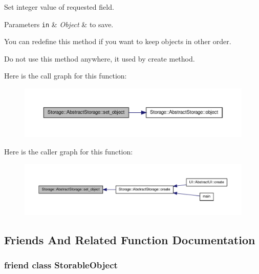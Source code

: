 Set integer value of requested field. 


\begin{DoxyParams}[1]{Parameters}
\mbox{\tt in}  & {\em Object} & to save.\\
\hline
\end{DoxyParams}
You can redefine this method if you want to keep objects in other order.

Do not use this method anywhere, it used by create method. 

Here is the call graph for this function:
\nopagebreak
\begin{figure}[H]
\begin{center}
\leavevmode
\includegraphics[width=400pt]{d6/da0/classStorage_1_1AbstractStorage_a641a6b75fe34c51943902d846ff66328_cgraph}
\end{center}
\end{figure}




Here is the caller graph for this function:
\nopagebreak
\begin{figure}[H]
\begin{center}
\leavevmode
\includegraphics[width=400pt]{d6/da0/classStorage_1_1AbstractStorage_a641a6b75fe34c51943902d846ff66328_icgraph}
\end{center}
\end{figure}




\subsection{Friends And Related Function Documentation}
\hypertarget{classStorage_1_1AbstractStorage_ac344c900799ce1069f4324f043f17763}{
\subsubsection[{StorableObject}]{\setlength{\rightskip}{0pt plus 5cm}friend class {\bf StorableObject}}}
\label{d6/da0/classStorage_1_1AbstractStorage_ac344c900799ce1069f4324f043f17763}


